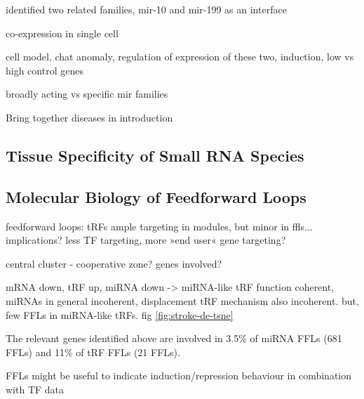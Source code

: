 identified two related families, mir-10 and mir-199 as an interface
 
 co-expression in single cell
 

cell model, chat anomaly, regulation of expression of these two, induction, low vs high control genes

broadly acting vs specific mir families



Bring together diseases in introduction

\subsection{Tissue Specificity of Small RNA Species} \label{sec:discussion:tissue}

\subsection{Molecular Biology of Feedforward Loops}

feedforward loops: tRFs ample targeting in modules, but minor in ffls... implications? less TF targeting, more »end user« gene targeting?

central cluster - cooperative zone? genes involved?

mRNA down, tRF up, miRNA down -> miRNA-like tRF function coherent, miRNAs in general incoherent, displacement tRF mechanism also incoherent. but, few FFLs in miRNA-like tRFs. fig \ref{fig:stroke-de-tsne}

The relevant genes identified above are involved in 3.5\% of miRNA FFLs (681 FFLs) and 11\% of tRF FFLs (21 FFLs). 

FFLs might be useful to indicate induction/repression behaviour in combination with TF data
